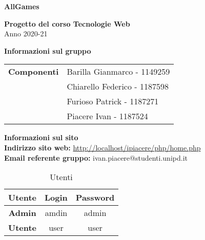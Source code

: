 \begin{center}
	\textbf{\Huge{AllGames}}\\
	\vspace{15pt}
\end{center}

\vspace{1.5cm}

\begin{center}
	\textbf{\huge{Progetto del corso Tecnologie Web}}\\[0.2cm]
	\Large{Anno 2020-21}
\end{center}

\vspace{5pt}

\begin{center}
	\textbf{\Large{Informazioni sul gruppo}}
\begin{table}[H]
	\hspace{3.5cm}
	\renewcommand{\arraystretch}{1.4}
	\begin{tabular}{l | l}
		\textbf{Componenti} & Barilla Gianmarco - 1149259\\
		& Chiarello Federico - 1187598\\
		& Furioso Patrick - 1187271\\
		& Piacere Ivan - 1187524\\
	\end{tabular}
\end{table}
\end{center}

\hspace{5pt}

\begin{center}
	\textbf{\Large{Informazioni sul sito}}\\
	\textbf{Indirizzo sito web:} \url{http://localhost/ipiacere/php/home.php}\\
	\textbf{Email referente gruppo:} ivan.piacere@studenti.unipd.it
	\renewcommand{\arraystretch}{1.8}
	\begin{longtable}{c c c}
		\caption{Utenti}\\
		\rowcolor[HTML]{FF9933}
		\textbf{Utente} & \textbf{Login} & \textbf{Password} \\
		\endhead
		\textbf{Admin} & amdin & admin\\
		\textbf{Utente} & user & user\\
	\end{longtable}
\end{center}

